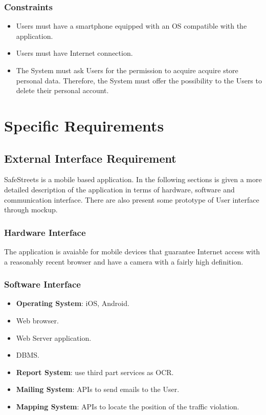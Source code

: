 \documentclass{report}
\begin{document}
\subsection{Constraints}
\begin{itemize}
	\item Users must have a smartphone equipped with an OS compatible with the application.
	\item Users must have Internet connection.
	\item The System must ask Users for the permission to acquire acquire store personal data. Therefore, the System must offer 
	the possibility to the Users to delete their personal account.
\end{itemize}

\chapter{Specific Requirements}
\section{External Interface Requirement}
SafeStreets is a mobile based application. In the following sections is given a more detailed description of the application in terms of hardware, software and communication interface. There are also present some prototype of User interface through mockup.
\subsection{Hardware Interface}
The application is avaiable for mobile devices that guarantee Internet access with a reasonably recent browser and have a camera with a fairly high definition.
\subsection{Software Interface}
\begin{itemize}
\item \textbf{Operating System}: iOS, Android.
\item Web browser.
\item Web Server application.
\item DBMS.
\item \textbf{Report System}: use third part services as OCR.
\item \textbf{Mailing System}: APIs to send emails to the User.
\item \textbf{Mapping System}: APIs to locate the position of the traffic violation.
\end{itemize}
\end{document}
